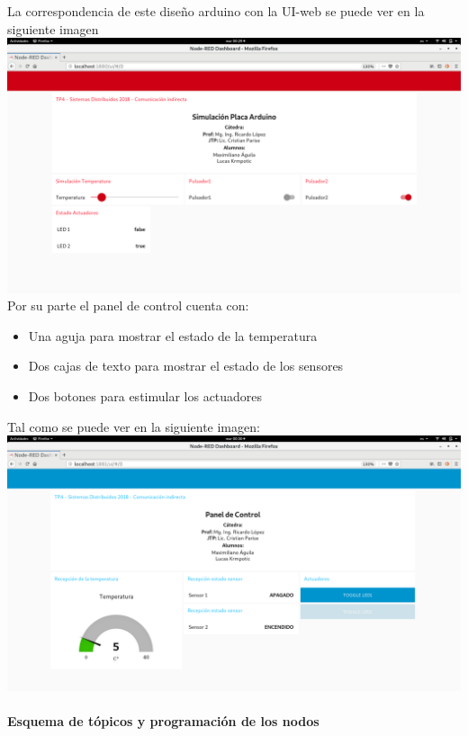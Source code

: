 \documentclass[11pt]{extarticle}
\begin{document}
    La correspondencia de este diseño arduino con la UI-web se puede ver en la siguiente imagen\\

    \includegraphics{images/simulacion-placa.png}\\

    Por su parte el panel de control cuenta con:

\begin{itemize}
\item
  Una aguja para mostrar el estado de la temperatura
\item
  Dos cajas de texto para mostrar el estado de los sensores
\item
  Dos botones para estimular los actuadores
\end{itemize}

Tal como se puede ver en la siguiente imagen:\\

    \includegraphics{images/panel-control.png}\\

    \hypertarget{esquema-de-tuxf3picos-y-programaciuxf3n-de-los-nodos}{%
\paragraph{Esquema de tópicos y programación de los
nodos}\label{esquema-de-tuxf3picos-y-programaciuxf3n-de-los-nodos}}
\end{document}
